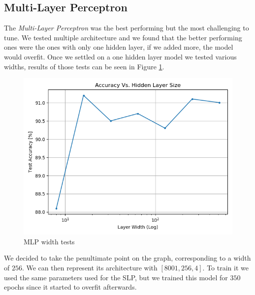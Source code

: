 \documentclass[10pt,a4paper]{report}
\begin{document}
\subsection{Multi-Layer Perceptron}
The \textit{Multi-Layer Perceptron} was the best performing but the most challenging to tune. We tested multiple architecture and we found that the better performing ones were the ones with only one hidden layer, if we added more, the model would overfit. Once we settled on a one hidden layer model we tested various widths, results of those tests can be seen in Figure \ref{fig:mlp_test}.
\begin{figure}[!ht]
\centering
\includegraphics[width=0.5\linewidth]{mlp_tests.png}
\caption{MLP width tests}
\label{fig:mlp_test}
\end{figure}
We decided to take the penultimate point on the graph, corresponding to a width of $256$. We can then represent its architecture with $[8001, 256, 4]$. To train it we used the same parameters used for the SLP, but we trained this model for $350$ epochs since it started to overfit afterwards. 
\end{document}

